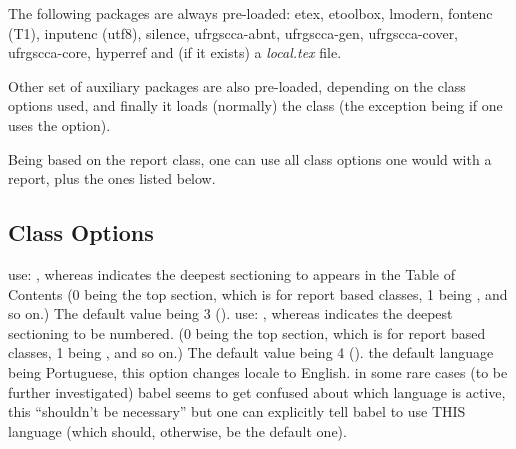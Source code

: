 \documentclass[dctools,english]{ufrgscca} %
\begin{document}
The following packages are always pre-loaded: {\MetaFmt[Pack]\sffamily etex, etoolbox, lmodern, fontenc (T1), inputenc (utf8), silence, ufrgscca-abnt, ufrgscca-gen, ufrgscca-cover, ufrgscca-core, hyperref} and (if it exists) a \emph{local.tex} file.

Other set of auxiliary packages are also pre-loaded, depending on the class options used, and finally it loads (normally) the  class (the exception being if one uses the  option).

Being based on the report class, one can use all class options one would with a report, plus the ones listed below.
\subsection{Class Options}
\begin{Options}
	 use: , whereas  indicates the deepest sectioning to appears in the Table of Contents (0 being the top section, which is \Macro{\chapter}{} for report based classes, 1 being \Macro{\section}{}, and so on.) The default value being 3 (\Macro{\subsubsection}{}).
	 use: , whereas  indicates the deepest sectioning to be numbered. (0 being the top section, which is \Macro{\chapter}{} for report based classes, 1 being \Macro{\section}{}, and so on.) The default value being 4 (\Macro{\paragraph}{}).
	 the default language being Portuguese, this option changes locale to English.
	 in some rare cases (to be further investigated) babel seems to get confused about which language is active, this “shouldn't be necessary” but one can explicitly tell babel to use THIS language (which should, otherwise, be the default one).

\end{Options}
\end{document}
